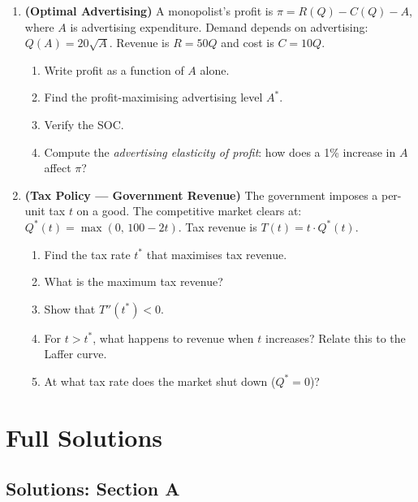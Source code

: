 \documentclass[12pt, a4paper]{article}
\theoremstyle{definition}
\begin{document}
\begin{enumerate}[label=\textbf{B\arabic*.}, leftmargin=2.5em]
\item \textbf{(Optimal Advertising)}
A monopolist's profit is $\pi = R(Q) - C(Q) - A$, where $A$ is
advertising expenditure.  Demand depends on advertising:
$Q(A) = 20\sqrt{A}$.  Revenue is $R = 50Q$ and cost is $C = 10Q$.

\begin{enumerate}[label=(\alph*)]
  \item Write profit as a function of $A$ alone.
  \item Find the profit-maximising advertising level $A^*$.
  \item Verify the SOC.
  \item Compute the \emph{advertising elasticity of profit}: how
        does a 1\% increase in $A$ affect $\pi$?
\end{enumerate}

\item \textbf{(Tax Policy --- Government Revenue)}
The government imposes a per-unit tax $t$ on a good.  The competitive
market clears at:
$Q^*(t) = \max(0,\, 100 - 2t)$.
Tax revenue is $T(t) = t \cdot Q^*(t)$.
\begin{enumerate}[label=(\alph*)]
  \item Find the tax rate $t^*$ that maximises tax revenue.
  \item What is the maximum tax revenue?
  \item Show that $T''(t^*)<0$.
  \item For $t > t^*$, what happens to revenue when $t$ increases?
        Relate this to the Laffer curve.
  \item At what tax rate does the market shut down ($Q^*=0$)?
\end{enumerate}

\end{enumerate}

\newpage
\section{Full Solutions}

\subsection{Solutions: Section A}
\end{document}
